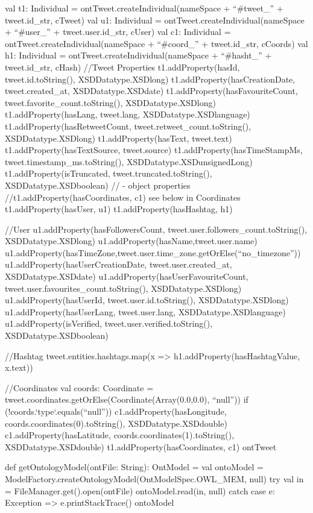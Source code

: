 \begin{listing}[
  language = scala,
  numbers=left,
  numberstyle=\tiny,
  stepnumber=5,
  numbersep=5pt,
  frame=single,
  caption  = {ms.semtweet: transformando tweet en triplas},
  label    = code:ms.semtweet]
{{    val t1: Individual = ontTweet.createIndividual(nameSpace + ``#tweet_'' + tweet.id_str, cTweet)
    val u1: Individual = ontTweet.createIndividual(nameSpace + ``#user_'' + tweet.user.id_str, cUser)
    val c1: Individual = ontTweet.createIndividual(nameSpace + ``#coord_'' + tweet.id_str, cCoords)
    val h1: Individual = ontTweet.createIndividual(nameSpace + ``#hasht_'' + tweet.id_str, cHash)
    //Tweet Properties
    t1.addProperty(hasId, tweet.id.toString(), XSDDatatype.XSDlong)
    t1.addProperty(hasCreationDate, tweet.created_at, XSDDatatype.XSDdate)
    t1.addProperty(hasFavouriteCount, tweet.favorite_count.toString(), XSDDatatype.XSDlong)
    t1.addProperty(hasLang, tweet.lang, XSDDatatype.XSDlanguage)
    t1.addProperty(hasRetweetCount, tweet.retweet_count.toString(), XSDDatatype.XSDlong)
    t1.addProperty(hasText, tweet.text)
    t1.addProperty(hasTextSource, tweet.source)
    t1.addProperty(hasTimeStampMs, tweet.timestamp_ms.toString(), XSDDatatype.XSDunsignedLong)
    t1.addProperty(isTruncated, tweet.truncated.toString(), XSDDatatype.XSDboolean)
    // - object properties
    //t1.addProperty(hasCoordinates, c1) see below in Coordinates
    t1.addProperty(hasUser, u1)
    t1.addProperty(hasHashtag, h1)

    //User
    u1.addProperty(hasFollowersCount, tweet.user.followers_count.toString(), XSDDatatype.XSDlong)
    u1.addProperty(hasName,tweet.user.name)
    u1.addProperty(hasTimeZone,tweet.user.time_zone.getOrElse(``no_timezone''))
    u1.addProperty(hasUserCreationDate, tweet.user.created_at, XSDDatatype.XSDdate)
    u1.addProperty(hasUserFavouriteCount, tweet.user.favourites_count.toString(), XSDDatatype.XSDlong)
    u1.addProperty(hasUserId, tweet.user.id.toString(), XSDDatatype.XSDlong)
    u1.addProperty(hasUserLang, tweet.user.lang, XSDDatatype.XSDlanguage)
    u1.addProperty(isVerified, tweet.user.verified.toString(), XSDDatatype.XSDboolean)

    //Hashtag
    tweet.entities.hashtags.map(x => h1.addProperty(hasHashtagValue, x.text))

    //Coordinates
    val coords: Coordinate = tweet.coordinates.getOrElse(Coordinate(Array(0.0,0.0), ``null''))
    if (!coords.`type`.equals(``null'')){
      c1.addProperty(hasLongitude, coords.coordinates(0).toString(), XSDDatatype.XSDdouble)
      c1.addProperty(hasLatitude, coords.coordinates(1).toString(), XSDDatatype.XSDdouble)
      t1.addProperty(hasCoordinates, c1)
    }
    ontTweet
  }


  def getOntologyModel(ontFile: String): OntModel = {
    val ontoModel = ModelFactory.createOntologyModel(OntModelSpec.OWL_MEM, null)
    try{
      val in = FileManager.get().open(ontFile)
      ontoModel.read(in, null)
    }
    catch {
      case e: Exception => e.printStackTrace()
    }
    ontoModel
  }
}
\end{listing}
